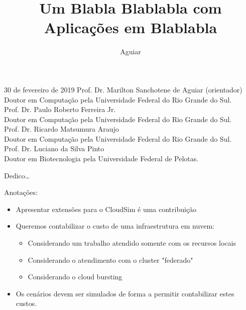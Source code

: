 \documentclass[tese,capa]{texufpel}
\title{Um Blabla Blablabla com Aplicações em Blablabla}
\author{Aguiar}{Marilton Sanchotene de}
\begin{document}

\maketitle 

\sloppy

\fichacatalografica

\begin{aprovacao}{30 de fevereiro de 2019} %
\noindent Prof. Dr. Marilton Sanchotene de Aguiar (orientador)\\
Doutor em Computação pela Universidade Federal do Rio Grande do Sul.\\[1cm]

\noindent Prof. Dr. Paulo Roberto Ferreira Jr.\\
Doutor em Computação pela Universidade Federal do Rio Grande do Sul.\\[1cm]

\noindent Prof. Dr. Ricardo Matsumura Araujo\\
Doutor em Computação pela Universidade Federal do Rio Grande do Sul.\\[1cm]

\noindent Prof. Dr. Luciano da Silva Pinto\\
Doutor em Biotecnologia pela Universidade Federal de Pelotas.
\end{aprovacao}

\begin{dedicatoria}
  Dedico\ldots 
  
  Anotações:
  \begin{itemize}
      \item Apresentar extensões para o CloudSim é uma contribuição
      \item Queremos contabilizar o custo de uma infraestrutura em nuvem:
        \begin{itemize}
            \item Considerando um trabalho atendido somente com os recursos locais
            \item Considerando o atendimento com o cluster "federado"
            \item Considerando o cloud bursting
        \end{itemize}
        \item Os cenários devem ser simulados de forma a permitir contabilizar estes custos.
  \end{itemize}
\end{dedicatoria}
\end{document}
